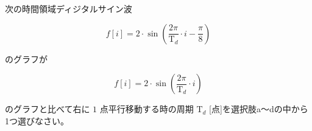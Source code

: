 次の時間領域ディジタルサイン波 

\[
f[i] = 2 \cdot \sin \left ( \frac{2 \pi}{\textrm{T}_d}  \cdot i - \frac{\pi}{8} \right )
\]

\noindent のグラフが

\[
f[i] = 2 \cdot \sin \left ( \frac{2 \pi}{\textrm{T}_d} \cdot i \right )
\]

\noindent のグラフと比べて右に $1$ 点平行移動する時の周期 $\textrm{T}_d$ [点]を選択肢a〜dの中から1つ選びなさい。
